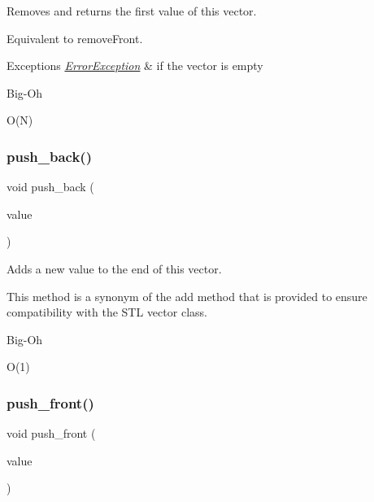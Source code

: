 Removes and returns the first value of this vector. 

Equivalent to remove\+Front. 
\begin{DoxyExceptions}{Exceptions}
{\em \mbox{\hyperlink{classErrorException}{Error\+Exception}}} & if the vector is empty \\
\hline
\end{DoxyExceptions}
\begin{DoxyRefDesc}{Big-\/\+Oh}
\item[\mbox{\hyperlink{BigOh__BigOh000123}{Big-\/\+Oh}}]O(\+N) \end{DoxyRefDesc}
\mbox{\label{classVector_a8ff6f18ca45e769f2f8c7a0bcf79fad9}} 
\subsubsection{\texorpdfstring{push\+\_\+back()}{push\_back()}}
{\footnotesize\ttfamily void push\+\_\+back (\begin{DoxyParamCaption}\item[{const Value\+Type \&}]{value }\end{DoxyParamCaption})}



Adds a new value to the end of this vector. 

This method is a synonym of the add method that is provided to ensure compatibility with the S\+TL {\ttfamily vector} class. \begin{DoxyRefDesc}{Big-\/\+Oh}
\item[\mbox{\hyperlink{BigOh__BigOh000125}{Big-\/\+Oh}}]O(1) \end{DoxyRefDesc}
\mbox{\label{classVector_a9737dc314198d1cf306325134f000c5a}} 
\subsubsection{\texorpdfstring{push\+\_\+front()}{push\_front()}}
{\footnotesize\ttfamily void push\+\_\+front (\begin{DoxyParamCaption}\item[{const Value\+Type \&}]{value }\end{DoxyParamCaption})}



